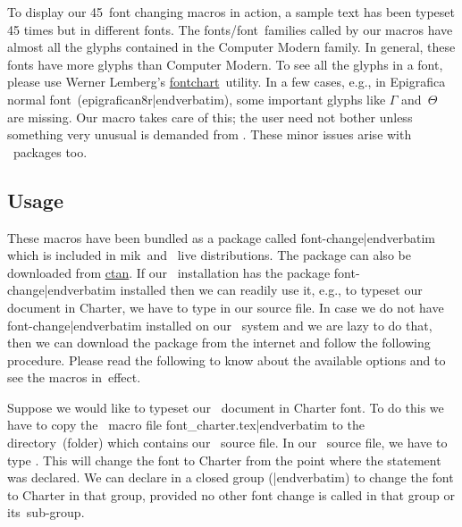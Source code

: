 {{To display our 45~font changing macros in action, a sample text has been typeset 45 times but in different fonts. The fonts/font~families called by our macros have almost all the glyphs contained in the Computer Modern family. In general, these fonts have more glyphs than Computer Modern. To see all the glyphs in a font, please use Werner Lemberg's \href{http://www.ctan.org/tex-archive/help/Catalogue/entries/fontchart.html}{fontchart}~utility. In a few cases, e.g., in Epigrafica normal font~(\verbatim epigrafican8r|endverbatim), some important glyphs like $\Gamma$ and~$\Theta$ are missing. Our macro takes care of this; the user need not bother unless something very unusual is demanded from \capstex. These minor issues arise with \capslatex\ packages too.



\subsection{Usage}These macros have been bundled as a package called  {\color{brown}\verbatim font-change|endverbatim} which is included in {\caps m{\eightrm i}k}\capstex\ and \capstex~{\caps l{\eightrm ive}} distributions. The package can also be downloaded from \href{http://www.ctan.org/tex-archive/macros/plain/contrib/font-change/}{\caps ctan}. If our \capstex\ installation has the package {\color{brown}\verbatim font-change|endverbatim} installed then we can readily use it, e.g., to typeset our document in Charter, we have to type {\color{brown}\verbatim } in our source file. In case we do not have {\color{brown}\verbatim font-change|endverbatim} installed on our \capstex\ system and we are lazy to do that, then we can download the package from the internet and follow the following procedure. Please read the following to know about the available options and to see the macros in~effect.

Suppose we would like to typeset our \capstex\ document in Charter font. To do this we have to copy the \capstex\ macro file {\color{brown}\verbatim font_charter.tex|endverbatim} to the directory~(folder) which contains our \capstex\ source file. In our \capstex\ source file, we have to type {\color{brown}\verbatim }. This will change the font to Charter from the point where the statement {\color{brown}\verbatim } was declared. We can declare {\color{brown}\verbatim } in a closed group ({\color{brown}|endverbatim}) to change the font to Charter in that group, provided no other font change is called in that group or its~sub-group.

}}
